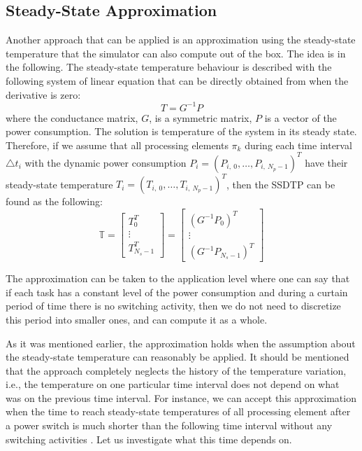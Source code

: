 \subsection{Steady-State Approximation}
Another approach that can be applied is an approximation using the steady-state temperature \cite{huang2009} that the simulator can also compute out of the box. The idea is in the following. The steady-state temperature behaviour is described with the following system of linear equation that can be directly obtained from  when the derivative is zero:
\[
  T = G^{-1} P
\]
where the conductance matrix, $G$, is a symmetric matrix, $P$ is a vector of the power consumption. The solution is temperature of the system in its steady state. Therefore, if we assume that all processing elements $\pi_k$ during each time interval $\triangle t_i$ with the dynamic power consumption $P_i = ( P_{i, \: 0}, \dots, P_{i, \: N_p - 1} )^T$ have their steady-state temperature $T_i = ( T_{i, \: 0}, \dots, T_{i, \: N_p - 1} )^T$, then the SSDTP can be found as the following:
\begin{equation*}
  \mathbb{T} = \left[
    \begin{array}{c}
      T_0^T \\
      \vdots \\
      T_{N_s - 1}^T
    \end{array}
  \right] = \left[
    \begin{array}{c}
      (G^{-1} P_0)^T \\
      \vdots \\
      (G^{-1} P_{N_s - 1})^T
    \end{array}
  \right]
\end{equation*}

The approximation can be taken to the application level where one can say that if each task has a constant level of the power consumption and during a curtain period of time there is no switching activity, then we do not need to discretize this period into smaller ones, and can compute it as a whole.

As it was mentioned earlier, the approximation holds when the assumption about the steady-state temperature can reasonably be applied. It should be mentioned that the approach completely neglects the history of the temperature variation, i.e., the temperature on one particular time interval does not depend on what was on the previous time interval. For instance, we can accept this approximation when the time to reach steady-state temperatures of all processing element after a power switch is much shorter than the following time interval without any switching activities \cite{huang2009}. Let us investigate what this time depends on.

